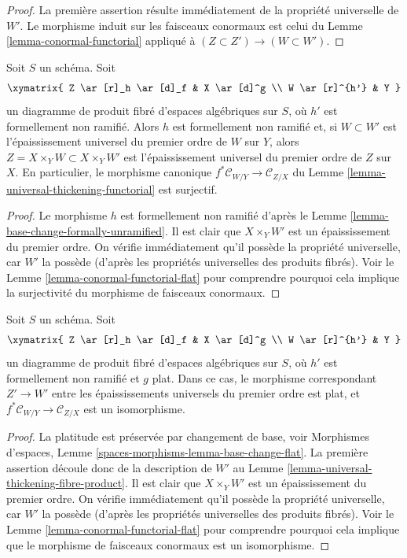 \begin{proof}
La première assertion résulte immédiatement de la propriété universelle de $W'$.
Le morphisme induit sur les faisceaux conormaux est celui du
Lemme \ref{lemma-conormal-functorial}
appliqué à $(Z \subset Z') \to (W \subset W')$.
\end{proof}

\begin{lemma}
\label{lemma-universal-thickening-fibre-product}
Soit $S$ un schéma. Soit
$$
\xymatrix{
Z \ar[r]_h \ar[d]_f & X \ar[d]^g \\
W \ar[r]^{h'} & Y
}
$$
un diagramme de produit fibré d'espaces algébriques sur $S$, où
$h'$ est formellement non ramifié. Alors $h$ est formellement non ramifié et, si
$W \subset W'$ est l'épaississement universel du premier ordre de $W$ sur $Y$,
alors $Z = X \times_Y W \subset X \times_Y W'$ est l'épaississement universel
du premier ordre de $Z$ sur $X$. En particulier, le morphisme canonique
$f^*\mathcal{C}_{W/Y} \to \mathcal{C}_{Z/X}$ du
Lemme \ref{lemma-universal-thickening-functorial}
est surjectif.
\end{lemma}

\begin{proof}
Le morphisme $h$ est formellement non ramifié d'après le
Lemme \ref{lemma-base-change-formally-unramified}.
Il est clair que $X \times_Y W'$ est un épaississement du premier ordre.
On vérifie immédiatement qu'il possède la propriété universelle,
car $W'$ la possède (d'après les propriétés universelles des
produits fibrés). Voir le
Lemme \ref{lemma-conormal-functorial-flat}
pour comprendre pourquoi cela implique la surjectivité du morphisme de faisceaux conormaux.
\end{proof}

\begin{lemma}
\label{lemma-universal-thickening-fibre-product-flat}
Soit $S$ un schéma. Soit
$$
\xymatrix{
Z \ar[r]_h \ar[d]_f & X \ar[d]^g \\
W \ar[r]^{h'} & Y
}
$$
un diagramme de produit fibré d'espaces algébriques sur $S$, où
$h'$ est formellement non ramifié et $g$ plat. Dans ce cas, le morphisme correspondant
$Z' \to W'$ entre les épaississements universels du premier ordre est plat, et
$f^*\mathcal{C}_{W/Y} \to \mathcal{C}_{Z/X}$ est un isomorphisme.
\end{lemma}

\begin{proof}
La platitude est préservée par changement de base, voir
Morphismes d'espaces, Lemme \ref{spaces-morphisms-lemma-base-change-flat}.
La première assertion découle donc de la description de $W'$ au
Lemme \ref{lemma-universal-thickening-fibre-product}.
Il est clair que $X \times_Y W'$ est un épaississement du premier ordre.
On vérifie immédiatement qu'il possède la propriété universelle,
car $W'$ la possède (d'après les propriétés universelles des
produits fibrés). Voir le
Lemme \ref{lemma-conormal-functorial-flat}
pour comprendre pourquoi cela implique que le morphisme de faisceaux conormaux est un isomorphisme.
\end{proof}

